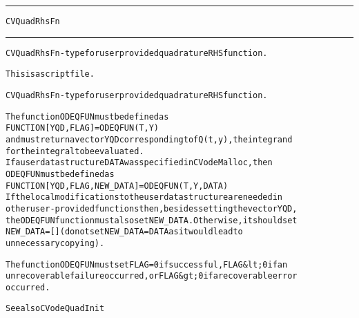 \begin{samepage}
\hrule
\begin{center}
{\large \verb!CVQuadRhsFn!}
\label{p:CVQuadRhsFn}
\end{center}
\hrule\vspace{0.1in}



\begin{alltt}
CVQuadRhsFn - type for user provided quadrature RHS function.
\end{alltt}

\end{samepage}



\begin{samepage}


\begin{alltt}
This is a script file. 
\end{alltt}

\end{samepage}



\begin{alltt}
CVQuadRhsFn - type for user provided quadrature RHS function.

   The function ODEQFUN must be defined as 
        FUNCTION [YQD, FLAG] = ODEQFUN(T,Y)
   and must return a vector YQD corresponding to fQ(t,y), the integrand
   for the integral to be evaluated.
   If a user data structure DATA was specified in CVodeMalloc, then
   ODEQFUN must be defined as
        FUNCTION [YQD, FLAG, NEW_DATA] = ODEQFUN(T,Y,DATA)
   If the local modifications to the user data structure are needed in
   other user-provided functions then, besides setting the vector YQD,
   the ODEQFUN function must also set NEW_DATA. Otherwise, it should set
   NEW_DATA=[] (do not set NEW_DATA = DATA as it would lead to
   unnecessary copying).

   The function ODEQFUN must set FLAG=0 if successful, FLAG&lt;0 if an
   unrecoverable failure occurred, or FLAG&gt;0 if a recoverable error
   occurred.

   See also CVodeQuadInit
\end{alltt}






\vspace{0.1in}